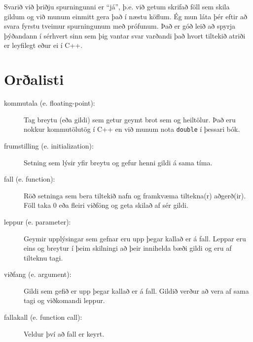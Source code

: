 Svarið við þriðju spurningunni er ``já'', þ.e. við getum skrifað föll sem skila gildum og við munum einmitt gera það í næstu köflum.
Ég mun láta þér eftir að svara fyrstu tveimur spurningunum með prófunum.
Það er góð leið að spyrja þýðandann í sérhvert sinn sem þig vantar svar varðandi það hvort tiltekið atriði er leyfilegt eður ei í C++.

\section{Orðalisti}

\begin{description}

\item[kommutala (e. floating-point):] Tag breytu (eða gildi) sem getur geymt brot sem og heiltölur.
Það eru nokkur kommutölutög í C++ en við munum nota {\tt double} í þessari bók.

\item[frumstilling (e. initialization):]  Setning sem lýsir yfir breytu og gefur henni gildi á sama tíma.

\item[fall (e. function):]  Röð setninga sem bera tiltekið nafn og framkvæma tiltekna(r) aðgerð(ir).
Föll taka 0 eða fleiri viðföng og geta skilað af sér gildi.

\item[leppur (e. parameter):]  Geymir upplýsingar sem gefnar eru upp þegar kallað er á fall.
Leppar eru eins og breytur í þeim skilningi að þeir innihelda bæði gildi og eru af tilteknu tagi.

\item[viðfang (e. argument):]  Gildi sem gefið er upp þegar kallað er á fall.
Gildið verður að vera af sama tagi og viðkomandi leppur.

\item[fallakall (e. function call):]  Veldur því að fall er keyrt. 


\end{description}
